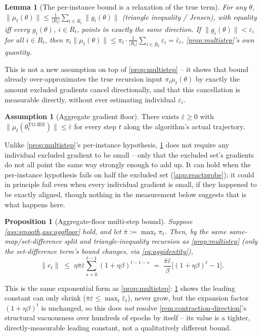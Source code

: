\documentclass{article}
\theoremstyle{plain}
\newtheorem{proposition}[theorem]{Proposition}
\newtheorem{lemma}[theorem]{Lemma}
\theoremstyle{definition}
\newtheorem{assumption}[theorem]{Assumption}
\theoremstyle{remark}
\begin{document}
\begin{lemma}[The per-instance bound is a relaxation of the true term]
\label{lem:jensen}
For any $\theta$, $\|\mu_t(\theta)\| \le \frac{1}{|R_t|}\sum_{i\in R_t}\|g_i(\theta)\|$ (triangle inequality / Jensen), with equality iff every $g_i(\theta)$, $i\in R_t$, points in exactly the same direction. If $\|g_i(\theta)\|<\varepsilon_i$ for all $i\in R_t$, then $\pi_t\|\mu_t(\theta)\| \le \pi_t\cdot\frac1{|R_t|}\sum_{i\in R_t}\varepsilon_i = \bar\varepsilon_t$, \cref{prop:multistep}'s own quantity.
\end{lemma}
This is not a new assumption on top of \cref{prop:multistep} -- it shows that bound already over-approximates the true recursion input $\pi_t\mu_t(\theta)$ by exactly the amount excluded gradients cancel directionally, and that this cancellation is measurable directly, without ever estimating individual $\varepsilon_i$.

\begin{assumption}[Aggregate gradient floor]
\label{ass:aggfloor}
There exists $\bar\varepsilon\ge0$ with $\|\mu_t(\theta_t^{\mathrm{TG\text{-}IES}})\|\le\bar\varepsilon$ for every step $t$ along the algorithm's actual trajectory.
\end{assumption}
Unlike \cref{prop:multistep}'s per-instance hypothesis, \cref{ass:aggfloor} does not require any individual excluded gradient to be small -- only that the excluded set's gradients do not all point the same way strongly enough to add up. It can hold when the per-instance hypothesis fails on half the excluded set (\cref{app:reactprobe}); it could in principle fail even when every individual gradient is small, if they happened to be exactly aligned, though nothing in the measurement below suggests that is what happens here.

\begin{proposition}[Aggregate-floor multi-step bound]
\label{prop:aggmultistep}
Suppose \cref{ass:smooth,ass:aggfloor} hold, and let $\bar\pi:=\max_t\pi_t$. Then, by the same same-map/set-difference split and triangle-inequality recursion as \cref{prop:multistep} (only the set-difference term's bound changes, via \cref{eq:aggidentity}),
\begin{equation}
\label{eq:aggmultistep}
\|e_t\| \;\le\; \eta\bar\pi\bar\varepsilon\sum_{s=0}^{t-1}(1+\eta\beta)^{t-1-s} \;=\; \frac{\bar\pi\bar\varepsilon}{\beta}\Big[(1+\eta\beta)^t-1\Big].
\end{equation}
\end{proposition}
This is the same exponential form as \cref{prop:multistep}: \cref{lem:jensen} shows the leading constant can only shrink ($\bar\pi\bar\varepsilon\le\max_t\bar\varepsilon_t$), never grow, but the expansion factor $(1+\eta\beta)^t$ is unchanged, so this does \emph{not} resolve \cref{rem:contraction-direction}'s structural vacuousness over hundreds of epochs by itself -- its value is a tighter, directly-measurable leading constant, not a qualitatively different bound.
\end{document}
